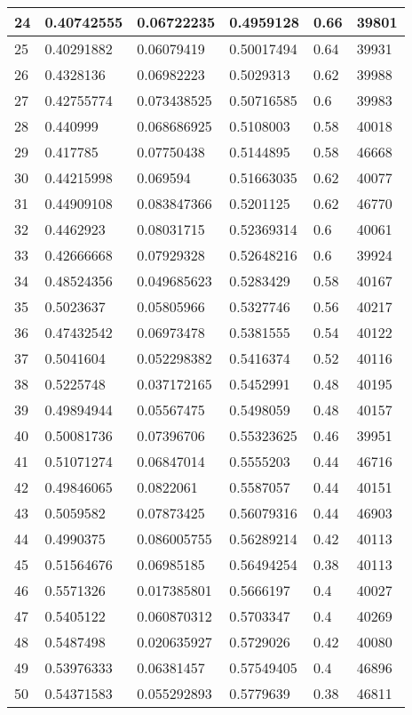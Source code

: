 \begin{longtable}{|l|l|l|l|l|l|}
24 & 0.40742555 & 0.06722235 & 0.4959128 & 0.66 & 39801 \\ \hline 
25 & 0.40291882 & 0.06079419 & 0.50017494 & 0.64 & 39931 \\ \hline 
26 & 0.4328136 & 0.06982223 & 0.5029313 & 0.62 & 39988 \\ \hline 
27 & 0.42755774 & 0.073438525 & 0.50716585 & 0.6 & 39983 \\ \hline 
28 & 0.440999 & 0.068686925 & 0.5108003 & 0.58 & 40018 \\ \hline 
29 & 0.417785 & 0.07750438 & 0.5144895 & 0.58 & 46668 \\ \hline 
30 & 0.44215998 & 0.069594 & 0.51663035 & 0.62 & 40077 \\ \hline 
31 & 0.44909108 & 0.083847366 & 0.5201125 & 0.62 & 46770 \\ \hline 
32 & 0.4462923 & 0.08031715 & 0.52369314 & 0.6 & 40061 \\ \hline 
33 & 0.42666668 & 0.07929328 & 0.52648216 & 0.6 & 39924 \\ \hline 
34 & 0.48524356 & 0.049685623 & 0.5283429 & 0.58 & 40167 \\ \hline 
35 & 0.5023637 & 0.05805966 & 0.5327746 & 0.56 & 40217 \\ \hline 
36 & 0.47432542 & 0.06973478 & 0.5381555 & 0.54 & 40122 \\ \hline 
37 & 0.5041604 & 0.052298382 & 0.5416374 & 0.52 & 40116 \\ \hline 
38 & 0.5225748 & 0.037172165 & 0.5452991 & 0.48 & 40195 \\ \hline 
39 & 0.49894944 & 0.05567475 & 0.5498059 & 0.48 & 40157 \\ \hline 
40 & 0.50081736 & 0.07396706 & 0.55323625 & 0.46 & 39951 \\ \hline 
41 & 0.51071274 & 0.06847014 & 0.5555203 & 0.44 & 46716 \\ \hline 
42 & 0.49846065 & 0.0822061 & 0.5587057 & 0.44 & 40151 \\ \hline 
43 & 0.5059582 & 0.07873425 & 0.56079316 & 0.44 & 46903 \\ \hline 
44 & 0.4990375 & 0.086005755 & 0.56289214 & 0.42 & 40113 \\ \hline 
45 & 0.51564676 & 0.06985185 & 0.56494254 & 0.38 & 40113 \\ \hline 
46 & 0.5571326 & 0.017385801 & 0.5666197 & 0.4 & 40027 \\ \hline 
47 & 0.5405122 & 0.060870312 & 0.5703347 & 0.4 & 40269 \\ \hline 
48 & 0.5487498 & 0.020635927 & 0.5729026 & 0.42 & 40080 \\ \hline 
49 & 0.53976333 & 0.06381457 & 0.57549405 & 0.4 & 46896 \\ \hline 
50 & 0.54371583 & 0.055292893 & 0.5779639 & 0.38 & 46811 \\ \hline 
\end{longtable}